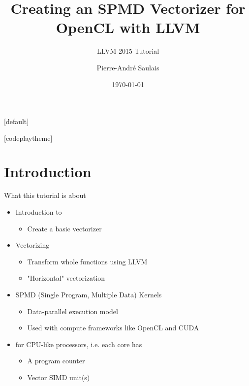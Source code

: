 \documentclass[t,aspectratio=169]{beamer}
\title{Creating an SPMD Vectorizer for OpenCL with LLVM}
\subtitle{LLVM 2015 Tutorial}
\author{Pierre-André Saulais}
\institute{Codeplay Software \\ @codeplaysoft}
\date{\today}
\begin{document}
[default]

\begin{frame}
  \vspace{4ex}
  \titlepage
\end{frame}


[codeplaytheme]

\section*{Introduction}

\begin{frame}{What this tutorial is about}


\begin{itemize}
    \item Introduction to
    \begin{itemize}
        \item Create a basic vectorizer
    \end{itemize}  
    \item Vectorizing
    \begin{itemize}
        \item Transform whole functions using LLVM
        \item "Horizontal" vectorization
    \end{itemize}  
    \item SPMD (Single Program, Multiple Data) Kernels
    \begin{itemize}
        \item Data-parallel execution model
        \item Used with compute frameworks like OpenCL and CUDA
    \end{itemize}
    \item for CPU-like processors, i.e. each core has
    \begin{itemize}
        \item A program counter
        \item Vector SIMD unit(s)
    \end{itemize}
\end{itemize}

\end{frame}
\end{document}
